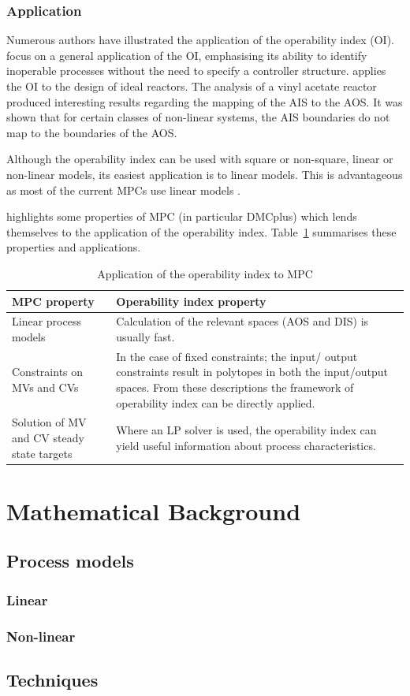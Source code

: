 \subsubsection{Application}
Numerous authors have illustrated the application of the operability index (OI).
\citet{opconproc} focus on a general application of the OI, emphasising its
ability to identify inoperable processes without the need to specify a
controller structure. \citet{opidealrx} applies the OI to the design of ideal
reactors. The analysis of a vinyl acetate reactor produced interesting results
regarding the mapping of the AIS to the AOS. It was shown that for certain
classes of non-linear systems, the AIS boundaries do not map to the boundaries
of the AOS.

Although the  operability index can be used with square or non-square, linear
or non-linear models, its easiest application is to linear models. This is
advantageous as most of the current MPCs use linear models \citep{vinsonphd}.

\citet{vinsonphd} highlights some properties of MPC (in particular DMCplus)
which lends themselves to the  application of the operability index. 
Table~\ref{tab:mpcoi} summarises these properties and applications.
\begin{table}[htbp]
  \centering
  \caption[Application of the operability index to MPC]{Application of the
    operability index to MPC \citep{vinsonphd}}
  \label{tab:mpcoi}
    \begin{tabular}{p{6cm} p{9cm}}
      \toprule
      MPC property & Operability index property \\
      \midrule
      Linear process models & Calculation of the relevant spaces (AOS and DIS)
                              is usually fast.\\
      Constraints on MVs and 
      CVs                   & In the case of fixed constraints; the input/
                              output constraints result in polytopes in both
                              the input/output spaces. From these descriptions
                              the framework of operability index can be directly
                              applied.\\
      Solution of MV and CV 
      steady state targets  & Where an LP solver is used, the operability index
                              can yield useful information about process
                              characteristics.\\
      \bottomrule
    \end{tabular}
\end{table}

\section{Mathematical Background}
\subsection{Process models}
\subsubsection{Linear}
\subsubsection{Non-linear}
\subsection{Techniques}
